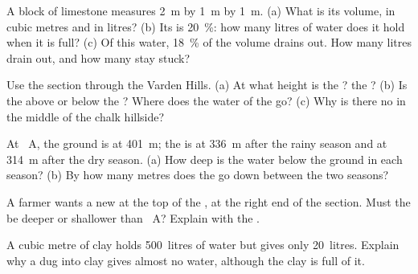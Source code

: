 \begin{exercise}[$\star\star$]\label{exo:g6:water-underground:6}
A block of limestone measures 2~m by 1~m by 1~m. (a) What is its volume, in
cubic metres and in litres? (b) Its  is 20~\%: how many litres of
water does it hold when it is full? (c) Of this water, 18~\% of the
volume drains out. How many litres drain out, and how many stay stuck?
\end{exercise}

\begin{exercise}[$\star\star$]\label{exo:g6:water-underground:7}
Use the section through the Varden Hills. (a) At what height is the ?
the ? (b) Is the  above or below the ? Where does the water
of the  go? (c) Why is there no  in the middle of the chalk
hillside?
\end{exercise}

\begin{exercise}[$\star\star$]\label{exo:g6:water-underground:8}
At ~A, the ground is at 401~m; the  is at 336~m after the
rainy season and at 314~m after the dry season. (a) How deep is the water
below the ground in each season? (b) By how many metres does the 
go down between the two seasons?
\end{exercise}

\begin{exercise}[$\star\star$]\label{exo:g6:water-underground:9}
A farmer wants a new  at the top of the , at the right end of the
section. Must the  be deeper or shallower than ~A? Explain with the
.
\end{exercise}

\begin{exercise}[$\star\star$]\label{exo:g6:water-underground:10}
A cubic metre of clay holds 500~litres of water but gives only 20~litres.
Explain why a  dug into clay gives almost no water, although the clay
is full of it.
\end{exercise}

